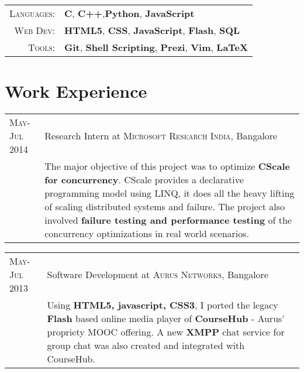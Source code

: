 \documentclass[a4paper,10pt]{article} %
\begin{document}
\begin{tabular}{rl}

    \textsc{Languages}: %
            & \textbf{C}, \textbf{C++},\textbf{Python}, \textbf{JavaScript} \\
    \textsc{Web Dev}: %
            & \textbf{HTML5}, \textbf{CSS}, \textbf{JavaScript}, \textbf{Flash}, \textbf{SQL}\\
    \textsc{Tools}: %
            & \textbf{Git}, \textbf{Shell Scripting}, \textbf{Prezi}, \textbf{Vim}, \textbf{LaTeX}\\

\end{tabular}


\section{Work Experience}

\begin{tabular}{p{2.2cm}|p{11cm}}
    \textsc{May-Jul 2014} & Research Intern at \textsc{Microsoft Research India}, Bangalore\emph{}\\
                          & \footnotesize{The major objective of this project was to optimize
                            \textbf{CScale for concurrency}. CScale provides a declarative programming model
                            using LINQ, it does all the heavy lifting of scaling distributed systems and
                            failure. The project also involved \textbf{failure testing and performance testing}
                            of the concurrency optimizations in real world scenarios.}\\
\end{tabular}

\begin{tabular}{p{2.2cm}|p{11cm}}
    \textsc{May-Jul 2013} & Software Development at \textsc{Aurus Networks}, Bangalore\emph{}\\
                          & \footnotesize{Using \textbf{HTML5, javascript, CSS3}, I ported the legacy
                            \textbf{Flash} based online media player of \textbf{CourseHub} - Aurus'
                            propriety MOOC offering. A new \textbf{XMPP} chat service for group chat
                            was also created and integrated with CourseHub.}\\
\end{tabular}
\end{document}
